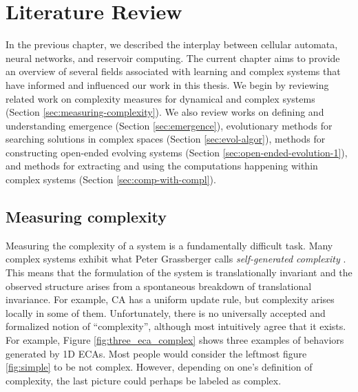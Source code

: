 \chapter{Literature Review}
\label{cha:literature-review}

In the previous chapter, we described the interplay between cellular 
automata, neural networks, and reservoir computing. The current chapter aims to 
provide an overview of several fields associated with learning and complex
systems that have informed and influenced our work in this thesis. We begin by reviewing related
work on complexity measures for dynamical and complex systems (Section
\ref{sec:measuring-complexity}). We also review works on defining and
understanding emergence (Section \ref{sec:emergence}), evolutionary methods for
searching solutions in complex spaces (Section \ref{sec:evol-algor}), methods
for constructing open-ended evolving systems (Section
\ref{sec:open-ended-evolution-1}), and methods for extracting and using the
computations happening within complex systems (Section
\ref{sec:comp-with-compl}).

\section{Measuring complexity\label{sec:measuring-complexity}}

Measuring the complexity of a system is a fundamentally difficult task. Many
complex systems exhibit what Peter Grassberger calls \emph{self-generated
  complexity} \parencite{grassbergerQuantitativeTheorySelfgenerated1986}. This
means that the formulation of the system is translationally invariant and the
observed structure arises from a spontaneous breakdown of translational
invariance. For example, \ac{CA} has a uniform update rule, but complexity 
arises locally in some of them. Unfortunately, there is no universally accepted and formalized notion
of ``complexity'', although most intuitively agree that it exists. For
example, Figure \ref{fig:three_eca_complex} shows three examples of behaviors
generated by 1D \acp{ECA}. Most people would consider the leftmost figure
\ref{fig:simple} to be not complex. However, depending on one's definition of
complexity, the last picture could perhaps be labeled as complex.


